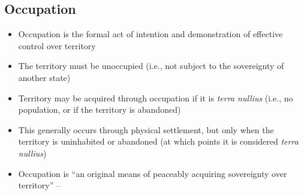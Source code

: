 \subsection{Occupation}
\begin{itemize}
    \item Occupation is the formal act of intention and demonstration of effective control over territory
    \item The territory must be unoccupied (i.e., not subject to the sovereignty of another state)
    \item Territory may be acquired through occupation if it is \textit{terra nullius} (i.e., no population, or if the territory is abandoned)
    \item This generally occurs through physical settlement, but only when the territory is uninhabited or abandoned (at which points it is considered \textit{terra nullius})
    \item Occupation is ``an original means of peaceably acquiring sovereignty over territory'' -- 
\end{itemize}

